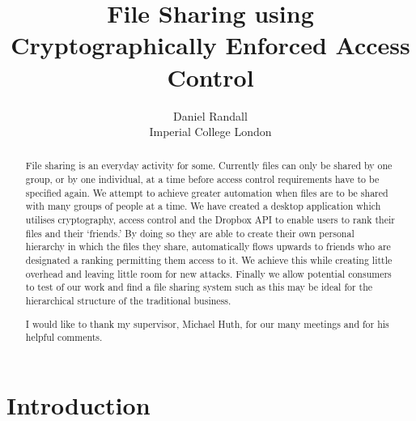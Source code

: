 \documentclass[12pt, titlepage]{article}
\title{File Sharing using Cryptographically Enforced Access Control}
\author{Daniel Randall \\ Imperial College London}
\date{}
\begin{document}
\maketitle

\begin{abstract}
File sharing is an everyday activity for some. Currently files can only be shared by one group, or by one individual, at a time before access control requirements have to be specified again. We attempt to achieve greater automation when files are to be shared with many groups of people at a time. We have created a desktop application which utilises cryptography, access control and the Dropbox API to enable users to rank their files and their `friends.' By doing so they are able to create their own personal hierarchy in which the files they share, automatically flows upwards to friends who are designated a ranking permitting them access to it. We achieve this while creating little overhead and leaving little room for new attacks. Finally we allow potential consumers to test of our work and find a file sharing system such as this may be ideal for the hierarchical structure of the traditional business.
\end{abstract}

\renewcommand{\abstractname}{Acknowledgements}
\begin{abstract}
I would like to thank my supervisor, Michael Huth, for our many meetings and for his helpful comments.
\end{abstract}


\newpage
\tableofcontents
\newpage

\newcommand{\defeq}{\stackrel{\textup{\tiny def}}{=}}

\section{Introduction}
\end{document}
